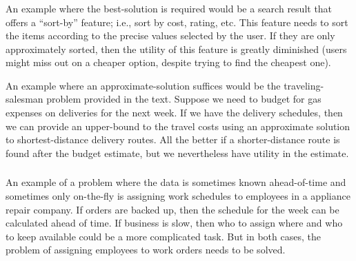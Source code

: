 \subsubsection{}
    An example where the best-solution is required would be a search result that offers a ``sort-by'' feature; i.e., sort by cost, rating, etc.  This feature needs to sort the items according to the precise values selected by the user.  If they are only approximately sorted, then the utility of this feature is greatly diminished (users might miss out on a cheaper option, despite trying to find the cheapest one).

    An example where an approximate-solution suffices would be the traveling-salesman problem provided in the text.  Suppose we need to budget for gas expenses on deliveries for the next week.  If we have the delivery schedules, then we can provide an upper-bound to the travel costs using an approximate solution to shortest-distance delivery routes.  All the better if a shorter-distance route is found after the budget estimate, but we nevertheless have utility in the estimate.

\subsubsection{}
    An example of a problem where the data is sometimes known ahead-of-time and sometimes only on-the-fly is assigning work schedules to employees in a appliance repair company.  If orders are backed up, then the schedule for the week can be calculated ahead of time.  If business is slow, then who to assign where and who to keep available could be a more complicated task.  But in both cases, the problem of assigning employees to work orders needs to be solved.